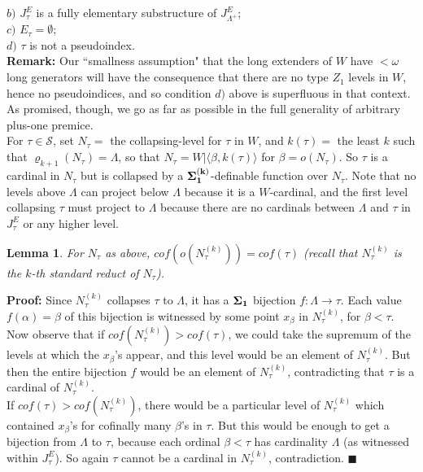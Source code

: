 \documentclass[12pt]{article}
\newtheorem{lem}[thm]{Lemma}
\begin{document}
\indent $b)$ $J_\tau^E$ is a fully elementary substructure of $J_{\Lambda^+}^E$;\\

\indent $c)$ $E_\tau = \emptyset$;\\

\indent $d)$ $\tau$ is not a pseudoindex.\\

\textbf{Remark:}  Our ``smallness assumption" that the long extenders of $W$ have $< \omega$ long generators will have the consequence that there are no type $Z_1$ levels in $W$, hence no pseudoindices, and so condition $d)$ above is superfluous in that context.  As promised, though, we go as far as possible in the full generality of arbitrary plus-one premice.\\


For $\tau \in \mathcal{S}$, set $N_\tau =$ the collapsing-level for $\tau$ in $W$, and $k(\tau) =$ the least $k$ such that $\varrho_{k+1}( N_\tau )  = \Lambda$, so that $N_\tau = W  |  \langle \beta , k(\tau) \rangle$ for $\beta = o (N_\tau )$.  So $\tau$ is a cardinal in $N_\tau$ but is collapsed by a $\bf{\Sigma}_{1}^{(k)}$-definable function over $N_\tau$.  Note that no levels above $\Lambda$ can project below $\Lambda$ because it is a $W$-cardinal, and the first level collapsing $\tau$ must project to $\Lambda$ because there are no cardinals between $\Lambda$ and $\tau$ in $J_\tau^E$ or any higher level.\\

\begin{lem}
For $N_\tau$ as above, $cof (o(N_\tau^{(k)})) = cof (\tau)$  (recall that $N_\tau^{(k)}$ is the $k$-th standard reduct of $N_\tau$).
\end{lem}

\indent \indent \textbf{Proof:} Since $N_\tau^{(k)}$ collapses $\tau$ to $\Lambda$, it has a $\bf{\Sigma}_1$ bijection $f: \Lambda \longrightarrow \tau$.  Each value $f(\alpha) = \beta$ of this bijection is witnessed by some point $x_\beta$ in $N_\tau^{(k)}$, for $\beta < \tau$.  Now observe that if $cof ( N_\tau^{(k)}) > cof(\tau)$, we could take the supremum of the levels at which the $x_\beta$'s appear, and this level would be an element of $N_\tau^{(k)}$.  But then the entire bijection $f$ would be an element of $N_\tau^{(k)}$, contradicting that $\tau$ is a cardinal of $N_\tau^{(k)}$.\\

If $cof(\tau) > cof(N_\tau^{(k)})$, there would be a particular level of $N_\tau^{(k)}$ which contained $x_\beta$'s for cofinally many $\beta$'s in $\tau$.  But this would be enough to get a bijection from $\Lambda$ to $\tau$, because each ordinal $\beta < \tau$ has cardinality $\Lambda$ (as witnessed within $J_\tau^E$).  So again $\tau$ cannot be a cardinal in $N_\tau^{(k)}$, contradiction. $\blacksquare$\\
\end{document}
